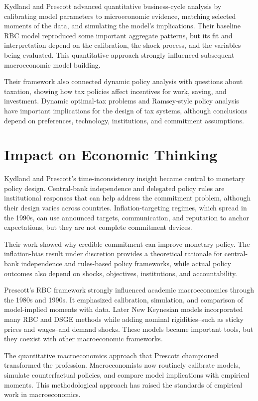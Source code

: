 Kydland and Prescott advanced quantitative business-cycle analysis by calibrating
model parameters to microeconomic evidence, matching selected moments of the
data, and simulating the model's implications. Their baseline RBC model
reproduced some important aggregate patterns, but its fit and interpretation
depend on the calibration, the shock process, and the variables being evaluated.
This quantitative approach strongly influenced subsequent macroeconomic model
building.

Their framework also connected dynamic policy analysis with questions about
taxation, showing how tax policies affect incentives for work, saving, and
investment. Dynamic optimal-tax problems and Ramsey-style policy analysis have
important implications for the design of tax systems, although conclusions
depend on preferences, technology, institutions, and commitment assumptions.

\section{Impact on Economic Thinking}
Kydland and Prescott's time-inconsistency insight became central to monetary
policy design. Central-bank independence and delegated policy rules are
institutional responses that can help address the commitment problem, although
their design varies across countries. Inflation-targeting regimes, which spread
in the 1990s, can use announced targets, communication, and reputation to anchor
expectations, but they are not complete commitment devices.

Their work showed why credible commitment can improve monetary policy. The
inflation-bias result under discretion provides a theoretical rationale for
central-bank independence and rules-based policy frameworks, while actual policy
outcomes also depend on shocks, objectives, institutions, and accountability.

Prescott's RBC framework strongly influenced academic macroeconomics through the
1980s and 1990s. It emphasized calibration, simulation, and comparison of
model-implied moments with data. Later New Keynesian models incorporated many
RBC and DSGE methods while adding nominal rigidities--such as sticky prices and
wages--and demand shocks. These models became important tools, but they coexist
with other macroeconomic frameworks.

The quantitative macroeconomics approach that Prescott championed transformed
the profession. Macroeconomists now routinely calibrate models, simulate
counterfactual policies, and compare model implications with empirical moments.
This methodological approach has raised the standards of empirical work in
macroeconomics.

